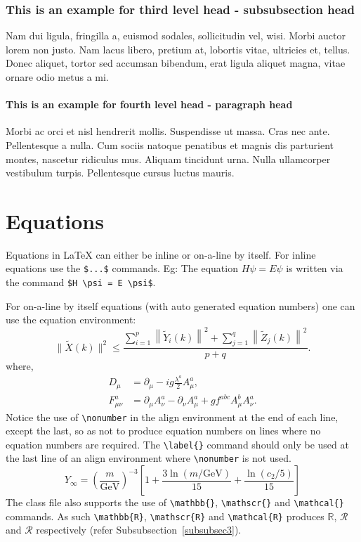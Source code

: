 \documentclass[numbers,webpdf]{ima-authoring-template}%
\theoremstyle{thmstyletwo}%
\numberwithin{equation}{section}
\begin{document}
\subsubsection{This is an example for third level head - subsubsection head}\label{subsubsec2}

Nam dui ligula, fringilla a, euismod sodales, sollicitudin vel, wisi. Morbi auctor lorem non justo. Nam lacus libero,
pretium at, lobortis vitae, ultricies et, tellus. Donec aliquet, tortor sed accumsan bibendum, erat ligula aliquet magna,
vitae ornare odio metus a mi.

\paragraph{This is an example for fourth level head - paragraph head}

 Morbi ac orci et nisl hendrerit mollis. Suspendisse ut massa. Cras nec ante. Pellentesque
a nulla. Cum sociis natoque penatibus et magnis dis parturient montes, nascetur ridiculus mus. Aliquam tincidunt
urna. Nulla ullamcorper vestibulum turpis. Pellentesque cursus luctus mauris.



\section{Equations}\label{sec4}

Equations in \LaTeX{} can either be inline or on-a-line by itself. For
inline equations use the \verb+$...$+ commands. Eg: The equation
$H\psi = E \psi$ is written via the command \verb+$H \psi = E \psi$+.

For on-a-line by itself equations (with auto generated equation numbers)
one can use the equation environment:
\begin{equation}
\|\tilde{X}(k)\|^2 \leq\frac{\sum\limits_{i=1}^{p}\left\|\tilde{Y}_i(k)\right\|^2+\sum\limits_{j=1}^{q}\left\|\tilde{Z}_j(k)\right\|^2 }{p+q}.\label{eq1}
\end{equation}
where,
\begin{align}
D_\mu &=  \partial_\mu - ig \frac{\lambda^a}{2} A^a_\mu, \nonumber \\
F^a_{\mu\nu} &= \partial_\mu A^a_\nu - \partial_\nu A^a_\mu + g f^{abc} A^b_\mu A^a_\nu.\label{eq2}
\end{align}
Notice the use of \verb+\nonumber+ in the align environment at the end
of each line, except the last, so as not to produce equation numbers on
lines where no equation numbers are required. The \verb+\label{}+ command
should only be used at the last line of an align environment where
\verb+\nonumber+ is not used.
\begin{equation}
Y_\infty = \left( \frac{m}{\textrm{GeV}} \right)^{-3}
    \left[ 1 + \frac{3 \ln(m/\textrm{GeV})}{15}
    + \frac{\ln(c_2/5)}{15} \right]
\end{equation}
The class file also supports the use of \verb+\mathbb{}+, \verb+\mathscr{}+ and
\verb+\mathcal{}+ commands. As such \verb+\mathbb{R}+, \verb+\mathscr{R}+
and \verb+\mathcal{R}+ produces $\mathbb{R}$, $\mathscr{R}$ and $\mathcal{R}$
respectively (refer Subsubsection~\ref{subsubsec3}).
\end{document}
